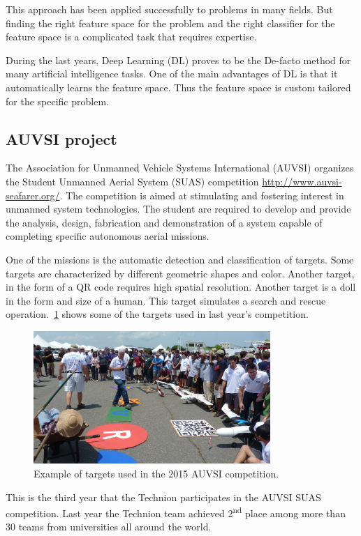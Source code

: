 \documentclass{article} %
\begin{document}
This approach has been applied successfully to problems in many fields. But
finding the right
feature space for the problem and the right classifier for the feature space is
a complicated task that requires expertise.

During the last years, Deep Learning (DL) proves to be the De-facto method for
many artificial intelligence tasks. One of the main advantages of DL is that
it automatically learns the feature space. Thus the feature space is custom
tailored for the specific problem.


\subsection{AUVSI project}

The Association for Unmanned Vehicle Systems International (AUVSI)
organizes the Student Unmanned Aerial System (SUAS) competition
\url{http://www.auvsi-seafarer.org/}. The competition is aimed  at
stimulating and fostering interest in unmanned system technologies.
The  student  are required  to  develop  and  provide  the  analysis,
design, fabrication and demonstration of a system capable of completing
specific autonomous aerial missions.

One of the missions is the automatic detection and classification of targets.
Some targets are characterized by different geometric shapes and color. Another
target, in the form of a QR code requires high spatial resolution. Another
target is a doll in the form and size of a human. This target simulates
a search and rescue operation.~\cref{fig:targets} shows
some of the targets used in last year's competition.
\begin{figure}[h]
	\centering
	\includegraphics[width=0.8\textwidth]{auvsi_targets}
	\caption{Example of targets used in the 2015 AUVSI competition.}
	\label{fig:targets}
\end{figure}

This is the third year that the Technion participates in the AUVSI SUAS
competition. Last year the Technion team achieved 2\textsuperscript{nd} place
among more than 30 teams from universities all around the world.
\end{document}
